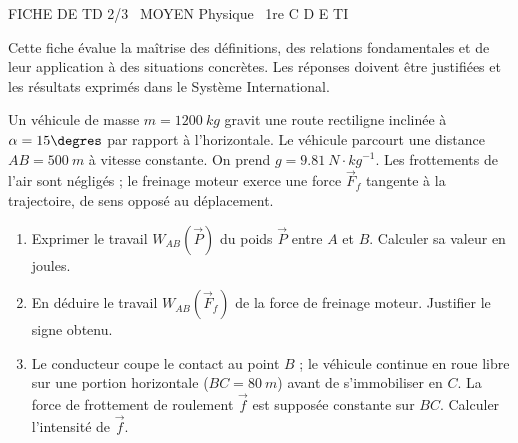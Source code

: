 \documentclass[11pt]{article}
\begin{document}
\begin{tcolorbox}[enhanced,colback=popink,colframe=popink,arc=10pt,boxrule=0pt,left=12pt,right=12pt,top=9pt,bottom=9pt]
{\color{white}\popxbold\small FICHE DE TD 2/3 \textbullet\ MOYEN \hfill Physique \textbullet\ 1re C D E TI\par}
\end{tcolorbox}
\vspace{4pt}
Cette fiche évalue la maîtrise des définitions, des relations fondamentales et de leur application à des situations concrètes. Les réponses doivent être justifiées et les résultats exprimés dans le Système International.

\begin{exercice}
Un véhicule de masse $m = \SI{1200}{kg}$ gravit une route rectiligne inclinée à $\alpha = 15\degres$ par rapport à l'horizontale. Le véhicule parcourt une distance $AB = \SI{500}{m}$ à vitesse constante. On prend $g = \SI{9,81}{N\cdot kg^{-1}}$. Les frottements de l'air sont négligés ; le freinage moteur exerce une force $\vec{F}_f$ tangente à la trajectoire, de sens opposé au déplacement.
\begin{enumerate}
    \item Exprimer le travail $W_{AB}(\vec{P})$ du poids $\vec{P}$ entre $A$ et $B$. Calculer sa valeur en joules.
    \item En déduire le travail $W_{AB}(\vec{F}_f)$ de la force de freinage moteur. Justifier le signe obtenu.
    \item Le conducteur coupe le contact au point $B$ ; le véhicule continue en roue libre sur une portion horizontale ($BC = \SI{80}{m}$) avant de s'immobiliser en $C$. La force de frottement de roulement $\vec{f}$ est supposée constante sur $BC$. Calculer l'intensité de $\vec{f}$.
\end{enumerate}
\end{exercice}
\end{document}
